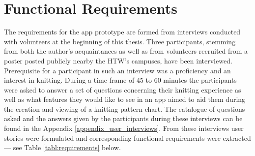 \section{Functional Requirements}

The requirements for the app prototype are formed from interviews conducted with volunteers at the beginning of this thesis. Three participants, stemming from both the author's acquaintances as well as from volunteers recruited from a poster posted publicly nearby the HTW’s campuses, have been interviewed. Prerequisite for a participant in such an interview was a proficiency and an interest in knitting. During a time frame of 45 to 60 minutes the participants were asked to answer a set of questions concerning their knitting experience as well as what features they would like to see in an app aimed to aid them during the creation and viewing of a knitting pattern chart. The catalogue of questions asked and the answers given by the participants during these interviews can be found in the Appendix \ref{appendix_user_interviews}. 
From these interviews user stories were formulated and corresponding functional requirements were extracted --- see Table \ref{tabl:requirements}  below.

